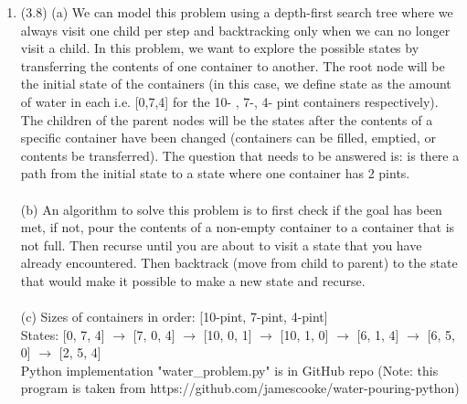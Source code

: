 \documentclass{article}
\begin{document}
\begin{enumerate}
		\item
			(3.8) (a) We can model this problem using a depth-first search tree where we always visit one child per step and backtracking only when we can no longer visit a child. In this problem, we want to explore the possible states by transferring the contents of one container to another. The root node will be the initial state of the containers (in this case, we define state as the amount of water in each i.e. [0,7,4] for the 10- , 7-, 4- pint containers respectively). The children of the parent nodes will be the states after the contents of a specific container have been changed (containers can be filled, emptied, or contents be transferred). The question that needs to be answered is: is there a path from the initial state to a state where one container has 2 pints.
			\\ \\
			(b) An algorithm to solve this problem is to first check if the goal has been met, if not, pour the contents of a non-empty container to a container that is not full. Then recurse until you are about to visit a state that you have already encountered. Then backtrack (move from child to parent) to the state that would make it possible to make a new state and recurse.\\ \\
			(c) Sizes of containers in order: [10-pint, 7-pint, 4-pint] \\
			States: [0, 7, 4] $\rightarrow$ [7, 0, 4] $\rightarrow$ [10, 0, 1] $\rightarrow$ [10, 1, 0] $\rightarrow$ [6, 1, 4] $\rightarrow$ [6, 5, 0] $\rightarrow$ [2, 5, 4] \\
			Python implementation "water\_problem.py" is in GitHub repo (Note: this program is taken from https://github.com/jamescooke/water-pouring-python)\\
	\end{enumerate}
\end{document}
